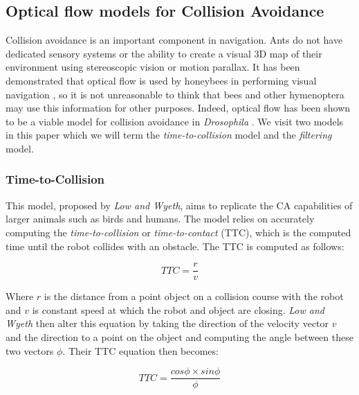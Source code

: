 \documentclass[a4paper,12pt,twoside,openright]{article}
\begin{document}
\subsection{ Optical flow models for Collision Avoidance } \label{sec:ofca}
Collision avoidance is an important component in navigation. Ants
do not have dedicated sensory systems or the ability to create a visual 3D map of their environment
using stereoscopic vision or motion parallax. It has been demonstrated that optical flow is used by
honeybees in performing visual navigation \cite{Dittmar2010}, so it is not unreasonable to
think that bees and other hymenoptera may use this information for other purposes. Indeed, optical
flow has been shown to be a viable model for collision avoidance in \textit{Drosophila}
\cite{Stewart2010}. We visit two models in this paper which we will term the
\textit{time-to-collision} model and the \textit{filtering} model.

\subsubsection{ Time-to-Collision }
This model, proposed by \textit{Low and Wyeth}\cite{Low2005}, aims to replicate the CA capabilities
of larger animals such as birds and humans. The model relies on accurately computing the
\textit{time-to-collision} or \textit{time-to-contact} (TTC), which is the computed time until the
robot collides with an obstacle. The TTC is computed as follows:

\begin{equation}
  \label{eqn:lowttc}
TTC = \frac{r}{v}
\end{equation}

Where $r$ is the distance from a point object on a collision course with the robot and $v$ is
constant speed at which the robot and object are closing.
\newline
\textit{Low and Wyeth} then alter this equation by taking the direction of the velocity vector $v$
and the direction to a point on the object and computing the angle between these two vectors $\phi$.
Their TTC equation then becomes:

\begin{equation}
 TTC = \frac{cos\phi \times sin\phi}{\phi}
\end{equation}
\end{document}
